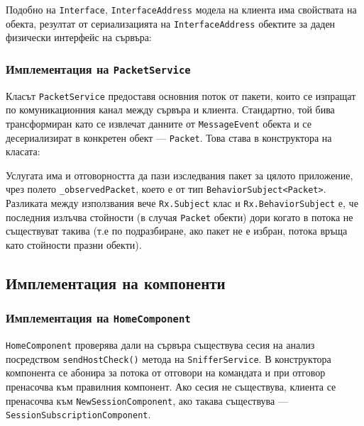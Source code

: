 \documentclass[12pt,a4paper,oneside]{book}
\begin{document}


Подобно на \texttt{Interface}, \texttt{InterfaceAddress} модела на клиента
има свойствата на обекта, резултат от сериализацията на
\texttt{InterfaceAddress} обектите за даден физически интерфейс на сървъра:



\subsubsection{Имплементация на \texttt{PacketService}}

Класът \texttt{PacketService} предоставя основния поток от пакети, които се
изпращат по комуникационния канал между сървъра и клиента. Стандартно, той бива
трансформиран като се извлечат данните от \texttt{MessageEvent} обекта и се десериализират
в конкретен обект --- \texttt{Packet}. Това става в конструктора на класата:



Услугата има и отговорността да пази изследвания пакет за цялото приложение,
чрез полето
\texttt{\_observedPacket}, което е от тип \texttt{BehaviorSubject<Packet>}.
Разликата между използвания вече \texttt{Rx.Subject} клас и
\texttt{Rx.BehaviorSubject} е, че последния излъчва стойности
(в случая \texttt{Packet} обекти) дори
когато в потока не съществуват такива (т.е по подразбиране, ако пакет не е
избран,
потока връща като стойности празни обекти).

\subsection{Имплементация на компоненти}

\subsubsection{Имплементация на \texttt{HomeComponent}}

\texttt{HomeComponent} проверява дали на сървъра съществува сесия на анализ
посредством \texttt{sendHostCheck()} метода на \texttt{SnifferService}. В
конструктора компонента се абонира за потока от отговори на командата и при
отговор пренасочва към правилния компонент. Ако сесия не съществува,
клиента се пренасочва към \texttt{NewSessionComponent}, ако такава
съществува --- \texttt{SessionSubscriptionComponent}.
\end{document}
